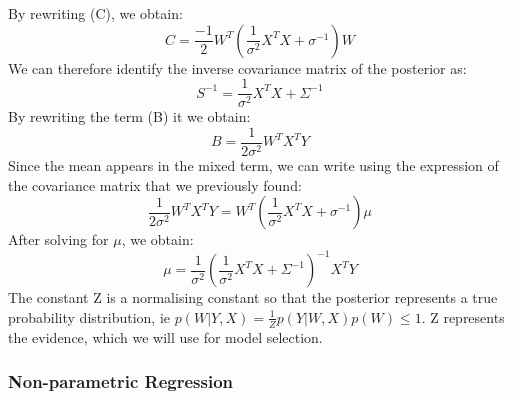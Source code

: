 \documentclass[a4paper,11pt]{article}
\theoremstyle{mytheor}
\begin{document}
By rewriting (C), we obtain:
\begin{equation*}
C = \frac{-1}{2}W^T(\frac{1}{\sigma^2}X^TX + \sigma^{-1})W
\end{equation*}
We can therefore identify the inverse covariance matrix of the posterior as:
\begin{equation*}
S^{-1} = \frac{1}{\sigma^2}X^TX + \Sigma^{-1}
\end{equation*}
By rewriting the term (B) it we obtain:
\begin{equation*}
B = \frac{1}{2\sigma^2} W^TX^TY
\end{equation*}
Since the mean appears in the mixed term, we can write using the expression of the covariance matrix that we previously found:
\begin{equation*}
\frac{1}{2\sigma^2} W^TX^TY = W^T(\frac{1}{\sigma^2}X^TX + \sigma^{-1})\mu
\end{equation*}
After solving for $\mu$, we obtain:
\begin{equation*}
\mu = \frac{1}{\sigma^2}(\frac{1}{\sigma^2} X^TX + \Sigma^{-1})^{-1}X^TY
\end{equation*}
The constant Z is a normalising constant so that the posterior represents a true probability distribution, ie $p(W|Y,X) =\frac{1}{Z}p(Y|W,X) p(W) \leq 1$. Z represents the evidence, which we will use for model selection.
\subsubsection{Non-parametric Regression}
\end{document}
